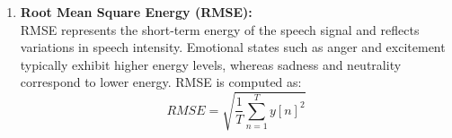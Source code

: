 \documentclass[iicol,sn-mathphys-num]{sn-jnl}%
\theoremstyle{thmstyleone}%
\theoremstyle{thmstyletwo}%
\theoremstyle{thmstylethree}%
\begin{document}
\begin{enumerate}
    

    \item \textbf{Root Mean Square Energy (RMSE):}\\
RMSE represents the short-term energy of the speech signal and reflects variations in speech intensity. Emotional states such as anger and excitement typically exhibit higher energy levels, whereas sadness and neutrality correspond to lower energy. RMSE is computed as:
 \begin{equation}
    RMSE = \sqrt{\frac{1}{T} \sum_{n=1}^{T} y[n]^2}
    \end{equation}    
    

\end{enumerate}
\end{document}
